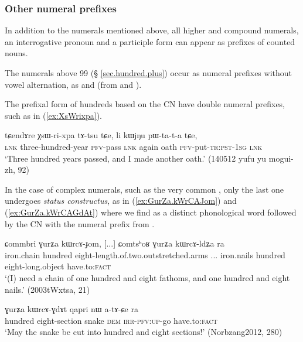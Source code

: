 \subsubsection{Other numeral prefixes} \label{sec:other.numeral.prefixes}
In addition to the numerals mentioned above, all higher and compound numerals, an interrogative pronoun and a participle form can appear as prefixes of counted nouns.

The numerals above 99 (§ \ref{sec.hundred.plus}) occur as numeral prefixes without vowel alternation, as  and  (from  and ). 

The prefixal form of hundreds based on the CN  have double numeral prefixes, such as  in (\ref{ex:XsWrixpa}).

\begin{exe}
\ex \label{ex:XsWrixpa}
 \gll tɕendɤre χsɯ-ri-xpa tɤ-tsu tɕe, li kɯjŋu pɯ-ta-t-a tɕe, \\
 \textsc{lnk} three-hundred-year \textsc{pfv}-pass \textsc{lnk} again oath \textsc{pfv}-put-\textsc{tr}:\textsc{pst}-\textsc{1sg} \textsc{lnk} \\
\glt `Three hundred years passed, and I made another oath.' (140512 yufu yu mogui-zh, 92)
\end{exe}

In the case of complex numerals, such as the very common , only the last one undergoes \textit{status constructus}, as in (\ref{ex:GurZa.kWrCAJom}) and (\ref{ex:GurZa.kWrCAGdAt}) where we find  as a distinct phonological word followed by the CN with the numeral prefix  from .

\begin{exe}
\ex \label{ex:GurZa.kWrCAJom}
 \gll ɕommbri ɣurʑa kɯrcɤ-ɟom, [...] ɕomtsʰoʁ ɣurʑa kɯrcɤ-ldʑa ra \\
 iron.chain hundred eight-length.of.two.outstretched.arms ... iron.nails hundred eight-long.object have.to:\textsc{fact} \\
 \glt  `(I) need a chain of one hundred and eight fathoms, and one hundred and eight nails.' (2003tWxtsa, 21)
\end{exe}

\begin{exe}
\ex \label{ex:GurZa.kWrCAGdAt}
 \gll  ɣurʑa kɯrcɤ-ɣdɤt qapri nɯ a-tɤ-ɕe ra \\
 hundred eight-section snake \textsc{dem} \textsc{irr}-\textsc{pfv}:\textsc{up}-go have.to:\textsc{fact} \\
\glt `May the snake be cut into hundred and eight sections!' (Norbzang2012,  280)
\end{exe}

